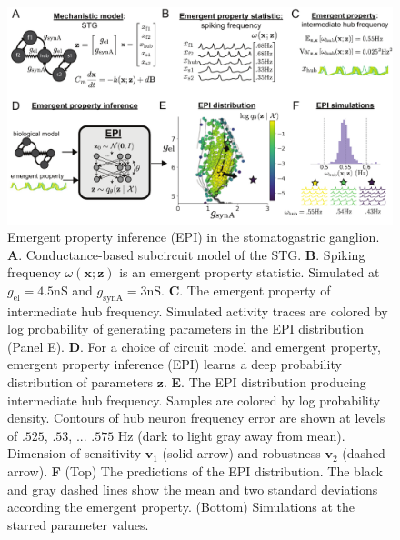 \documentclass[11pt]{article}
\begin{document}
\begin{figure}
\begin{center}
\includegraphics[scale=0.8]{figures/fig1/fig1.pdf}
\end{center}
\caption{Emergent property inference (EPI) in the stomatogastric ganglion.  
\textbf{A}. Conductance-based subcircuit model of the STG.
\textbf{B}. Spiking frequency $\omega(\mathbf{x}; \mathbf{z})$ is an emergent property statistic. 
Simulated at $g_{\text{el}} = 4.5$nS and $g_{\text{synA}} = 3$nS.
\textbf{C}. The emergent property of intermediate hub frequency.
Simulated activity traces are colored by log probability of generating parameters in the EPI distribution (Panel E).
\textbf{D}. For a choice of circuit model and emergent property, emergent property inference (EPI) learns a deep probability distribution of parameters $\mathbf{z}$.
\textbf{E}. The EPI distribution producing intermediate hub frequency.
Samples are colored by log probability density.  
Contours of hub neuron frequency error are shown at levels of $.525$, $.53$, ... $.575$ Hz (dark to light gray away from mean).
Dimension of sensitivity $\mathbf{v}_1$ (solid arrow) and robustness $\mathbf{v}_2$ (dashed arrow).
\textbf{F} (Top) The predictions of the EPI distribution.
The black and gray dashed lines show the mean and two standard deviations according the emergent property.
(Bottom) Simulations at the starred parameter values.
 }
 \label{fig:STG}
\end{figure}
\end{document}
